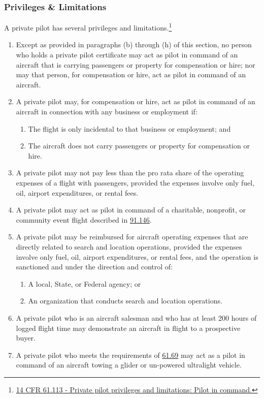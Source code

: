 \documentclass[12pt]{article}
\begin{document}
		\subsubsection{Privileges \& Limitations}
			A private pilot has several privileges and limitations.\footnote{\href{https://www.law.cornell.edu/cfr/text/14/61.113}{14 CFR 61.113 - Private pilot privileges and limitations: Pilot in command.}}
			\begin{enumerate}[label=\alph*]
				\item Except as provided in paragraphs (b) through (h) of this section, no person who holds a private pilot certificate may act as pilot in command of an aircraft that is carrying passengers or property for compensation or hire; nor may that person, for compensation or hire, act as pilot in command of an aircraft.
				\item A private pilot may, for compensation or hire, act as pilot in command of an aircraft in connection with any business or employment if:
					\begin{enumerate}[label=\arabic*]
						\item The flight is only incidental to that business or employment; and
						\item The aircraft does not carry passengers or property for compensation or hire.
					\end{enumerate}
				\item A private pilot may not pay less than the pro rata share of the operating expenses of a flight with passengers, provided the expenses involve only fuel, oil, airport expenditures, or rental fees.
				\item A private pilot may act as pilot in command of a charitable, nonprofit, or community event flight described in \href{https://www.law.cornell.edu/cfr/text/14/91.146}{91.146}.
				\item A private pilot may be reimbursed for aircraft operating expenses that are directly related to search and location operations, provided the expenses involve only fuel, oil, airport expenditures, or rental fees, and the operation is sanctioned and under the direction and control of:
					\begin{enumerate}[label=\arabic*]
						\item A local, State, or Federal agency; or
						\item An organization that conducts search and location operations.
					\end{enumerate}
				\item A private pilot who is an aircraft salesman and who has at least 200 hours of logged flight time may demonstrate an aircraft in flight to a prospective buyer.
				\item A private pilot who meets the requirements of \href{https://www.law.cornell.edu/cfr/text/14/61.69}{61.69} may act as a pilot in command of an aircraft towing a glider or un-powered ultralight vehicle.
			\end{enumerate}
\end{document}
